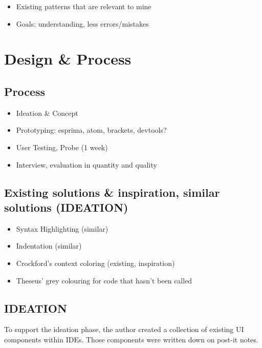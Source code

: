 \begin{itemize}
\itemsep1pt\parskip0pt
\item
  Existing patterns that are relevant to mine
\item
  Goals: understanding, less errors/mistakes
\end{itemize}

\section{Design \& Process}\label{design-process}

\subsection{Process}\label{process}

\begin{itemize}
\itemsep1pt\parskip0pt
\item
  Ideation \& Concept
\item
  Prototyping: esprima, atom, brackets, devtools?
\item
  User Testing, Probe (1 week)
\item
  Interview, evaluation in quantity and quality
\end{itemize}

\subsection{Existing solutions \& inspiration, similar solutions
(IDEATION)}\label{existing-solutions-inspiration-similar-solutions-ideation}

\begin{itemize}
\itemsep1pt\parskip0pt
\item
  Syntax Highlighting (similar)
\item
  Indentation (similar)
\item
  Crockford’s context coloring (existing, inspiration)
\item
  Theseus’ grey colouring for code that hasn’t been called
\end{itemize}

\subsection{IDEATION}\label{ideation}

To support the ideation phase, the author created a collection of
existing UI components within IDEs. Those components were written down
on post-it notes.


